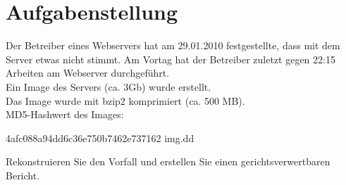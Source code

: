 \section{Aufgabenstellung}

Der Betreiber eines Webservers hat am 29.01.2010 festgestellte, dass mit dem Server etwas nicht stimmt. Am Vortag hat der Betreiber zuletzt gegen 22:15 Arbeiten am Webserver durchgeführt.
\\Ein Image des Servers (ca. 3Gb) wurde erstellt.
\\Das Image wurde mit bzip2 komprimiert (ca. 500 MB).
\\MD5-Hashwert des Images:
\begin{center}
4afc088a94dd6c36e750b7462e737162  img.dd
\end{center}
Rekonstruieren Sie den Vorfall und erstellen Sie einen gerichtsverwertbaren Bericht.
